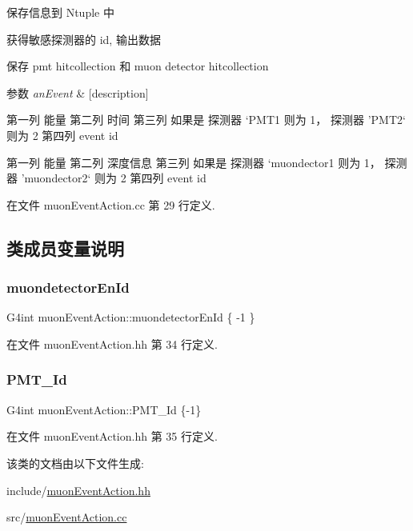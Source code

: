 保存信息到 Ntuple 中 

获得敏感探测器的 id, 输出数据

保存 pmt hitcollection 和 muon detector hitcollection 
\begin{DoxyParams}{参数}
{\em an\+Event} & \mbox{[}description\mbox{]} \\
\hline
\end{DoxyParams}
第一列 能量 第二列 时间 第三列 如果是 探测器 ‘\+P\+M\+T1\textquotesingle{} 则为 1， 探测器 ’\+P\+M\+T2‘ 则为 2 第四列 event id

第一列 能量 第二列 深度信息 第三列 如果是 探测器 ‘muondector1\textquotesingle{} 则为 1， 探测器 ’muondector2‘ 则为 2 第四列 event id

在文件 muon\+Event\+Action.\+cc 第 29 行定义.



\subsection{类成员变量说明}
\mbox{\label{classmuonEventAction_a16fc4814b4d56184e4e458b5b9c5b8b7}} 
\subsubsection{\texorpdfstring{muondetector\+En\+Id}{muondetectorEnId}}
{\footnotesize\ttfamily G4int muon\+Event\+Action\+::muondetector\+En\+Id \{ -\/1 \}\hspace{0.3cm}{\ttfamily [private]}}



在文件 muon\+Event\+Action.\+hh 第 34 行定义.

\mbox{\label{classmuonEventAction_a569d9e868f1be3db60bcc7ef512a3b7f}} 
\subsubsection{\texorpdfstring{P\+M\+T\+\_\+\+Id}{PMT\_Id}}
{\footnotesize\ttfamily G4int muon\+Event\+Action\+::\+P\+M\+T\+\_\+\+Id \{-\/1\}\hspace{0.3cm}{\ttfamily [private]}}



在文件 muon\+Event\+Action.\+hh 第 35 行定义.



该类的文档由以下文件生成\+:\begin{DoxyCompactItemize}
\item 
include/\hyperlink{muonEventAction_8hh}{muon\+Event\+Action.\+hh}\item 
src/\hyperlink{muonEventAction_8cc}{muon\+Event\+Action.\+cc}\end{DoxyCompactItemize}
